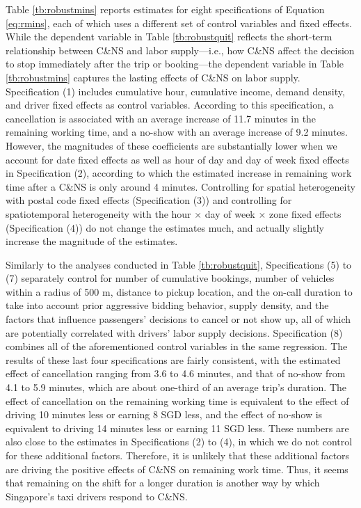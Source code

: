 \documentclass[reviewmode]{restud}
\begin{document}
Table \ref{tb:robustmins} reports estimates for eight specifications of Equation \eqref{eq:rmins}, each of which uses a different set of control variables and fixed effects. While the dependent variable in Table \ref{tb:robustquit} reflects the short-term relationship between C\&NS and labor supply---i.e., how C\&NS affect the decision to stop immediately after the trip or booking---the dependent variable in Table \ref{tb:robustmins} captures the lasting effects of C\&NS on labor supply. Specification (1) includes cumulative hour, cumulative income, demand density, and driver fixed effects as control variables. According to this specification, a cancellation is associated with an average increase of 11.7 minutes in the remaining working time, and a no-show with an average increase of 9.2 minutes. However, the magnitudes of these coefficients are substantially lower when we account for date fixed effects as well as hour of day and day of week fixed effects in Specification (2), according to which the estimated increase in remaining work time after a C\&NS is only around 4 minutes. Controlling for spatial heterogeneity with  postal code fixed effects (Specification (3)) and controlling for spatiotemporal heterogeneity with the hour $\times$ day of week $\times$ zone fixed effects (Specification (4)) do not change the estimates much, and actually slightly increase the magnitude of the estimates. 

Similarly to the analyses conducted in Table \ref{tb:robustquit}, Specifications (5) to (7) separately control for number of cumulative bookings, number of vehicles within a radius of 500 m, distance to pickup location, and the on-call duration to take into account prior aggressive bidding behavior, supply density, and the factors that influence passengers' decisions to cancel or not show up, all of which are potentially correlated with drivers' labor supply decisions. Specification (8) combines all of the aforementioned control variables in the same regression. The results of these last four specifications are fairly consistent, with the estimated effect of cancellation ranging from 3.6 to 4.6 minutes, and that of no-show from 4.1 to 5.9 minutes, which are about one-third of an average trip's duration. The effect of cancellation on the remaining working time is equivalent to the effect of driving 10 minutes less or earning 8 SGD less, and the effect of no-show is equivalent to driving 14 minutes less or earning 11 SGD less. These numbers are also close to the estimates in Specifications (2) to (4), in which we do not control for these additional factors. Therefore, it is unlikely that these additional factors are driving the positive effects of C\&NS on remaining work time. Thus, it seems that remaining on the shift for a longer duration is another way by which Singapore's taxi drivers respond to C\&NS.
\end{document}
